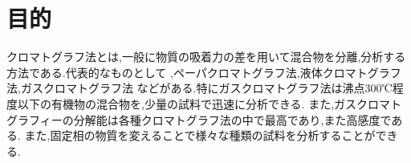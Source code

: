 \section{目的}
クロマトグラフ法とは,一般に物質の吸着力の差を用いて混合物を分離,分析する方法である.代表的なものとして
,ペーパクロマトグラフ法,液体クロマトグラフ法,ガスクロマトグラフ法
などがある.特にガスクロマトグラフ法は沸点300℃程度以下の有機物の混合物を,少量の試料で迅速に分析できる.
また,ガスクロマトグラフィーの分解能は各種クロマトグラフ法の中で最高であり,また高感度である.\cite{BN05476353}
また,固定相の物質を変えることで様々な種類の試料を分析することができる.
